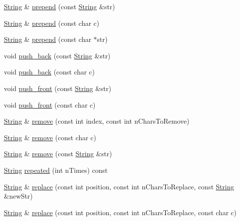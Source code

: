 \begin{DoxyCompactItemize}
\hyperlink{classprism_1_1_string}{String} \& \hyperlink{classprism_1_1_string_a0deb77daa45d88136d39b9960075cdb5}{prepend} (const \hyperlink{classprism_1_1_string}{String} \&str)
\item 
\hyperlink{classprism_1_1_string}{String} \& \hyperlink{classprism_1_1_string_a8f670c0ad0c7c00cdb89170f4b2275b3}{prepend} (const char c)
\item 
\hyperlink{classprism_1_1_string}{String} \& \hyperlink{classprism_1_1_string_a91f28e14e3febf379ff47a3bda12adab}{prepend} (const char $\ast$str)
\item 
void \hyperlink{classprism_1_1_string_a8e1459833ede719cd6b01ab5ce15d2e5}{push\+\_\+back} (const \hyperlink{classprism_1_1_string}{String} \&str)
\item 
void \hyperlink{classprism_1_1_string_a81b6a39be2a985ea02c46a4d1490755c}{push\+\_\+back} (const char c)
\item 
void \hyperlink{classprism_1_1_string_aadab394ea2370e2d23fcf932d373dcd3}{push\+\_\+front} (const \hyperlink{classprism_1_1_string}{String} \&str)
\item 
void \hyperlink{classprism_1_1_string_a5471ead67f8901cbed6bd43ef9f4a618}{push\+\_\+front} (const char c)
\item 
\hyperlink{classprism_1_1_string}{String} \& \hyperlink{classprism_1_1_string_a1bc8aa48c8b1f999102f1417ff091253}{remove} (const int index, const int n\+Chars\+To\+Remove)
\item 
\hyperlink{classprism_1_1_string}{String} \& \hyperlink{classprism_1_1_string_afebd670881d543691a420f61a1e4cf37}{remove} (const char c)
\item 
\hyperlink{classprism_1_1_string}{String} \& \hyperlink{classprism_1_1_string_a1d13f42ceb8d784e2379be1394bc4ea6}{remove} (const \hyperlink{classprism_1_1_string}{String} \&str)
\item 
\hyperlink{classprism_1_1_string}{String} \hyperlink{classprism_1_1_string_ac6aaed91f33e21a1d98a56139d678bc0}{repeated} (int n\+Times) const 
\item 
\hyperlink{classprism_1_1_string}{String} \& \hyperlink{classprism_1_1_string_a41e0509f93cfa38cd6df3f6965d6f143}{replace} (const int position, const int n\+Chars\+To\+Replace, const \hyperlink{classprism_1_1_string}{String} \&new\+Str)
\item 
\hyperlink{classprism_1_1_string}{String} \& \hyperlink{classprism_1_1_string_a6237d6e704f4c7b4133e279383607d7e}{replace} (const int position, const int n\+Chars\+To\+Replace, const char c)
\item 

\end{DoxyCompactItemize}
